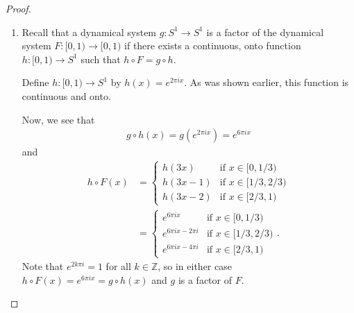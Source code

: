 \begin{proof}
\begin{enumerate}
    \item
      Recall that a dynamical system $g: S^1 \to S^1$ is a factor of the dynamical
      system $F:[0, 1) \to [0, 1)$ if there exists a continuous, onto function
      $h:[0,1) \to S^1$ such that $h \circ F = g \circ h$.

      Define $h:[0,1) \to S^1$ by $h(x) = e^{2\pi i x}$. As was shown earlier,
      this function is continuous and onto.

      Now, we see that
      \begin{align*}
        g \circ h(x) = g(e^{2\pi i x}) = e^{6\pi i x}
      \end{align*}
      and
      \begin{align*}
        h \circ F(x) &=
        \begin{cases}
          h(3x) & \text{if $x \in [0, 1/3)$}\\
          h(3x - 1) & \text{if $x \in [1/3, 2/3)$}\\
          h(3x - 2) & \text{if $x \in [2/3, 1)$}
        \end{cases}\\
        &= \begin{cases}
          e^{6\pi i x} & \text{if $x \in [0, 1/3)$}\\
          e^{6\pi i x - 2\pi i } & \text{if $x \in [1/3, 2/3)$}\\
          e^{6\pi i x - 4\pi i } & \text{if $x \in [2/3, 1)$}
        \end{cases}.
      \end{align*}
      Note that $e^{2 k\pi i} = 1$ for all $k \in \mathbb{Z}$,
      so in either case $h \circ F(x) = e^{6\pi i x} = g \circ h(x)$ and $g$ is a factor of $F$.

  \end{enumerate}
\end{proof}
\newpage
